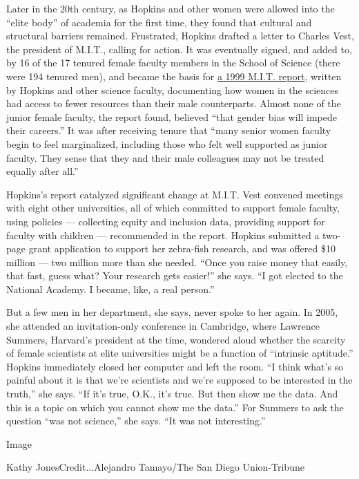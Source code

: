 Later in the 20th century, as Hopkins and other women were allowed into
the ``elite body'' of academia for the first time, they found that
cultural and structural barriers remained. Frustrated, Hopkins drafted a
letter to Charles Vest, the president of M.I.T., calling for action. It
was eventually signed, and added to, by 16 of the 17 tenured female
faculty members in the School of Science (there were 194 tenured men),
and became the basis for
\href{http://web.mit.edu/fnl/women/women.html}{a 1999 M.I.T. report},
written by Hopkins and other science faculty, documenting how women in
the sciences had access to fewer resources than their male counterparts.
Almost none of the junior female faculty, the report found, believed
``that gender bias will impede their careers.'' It was after receiving
tenure that ``many senior women faculty begin to feel marginalized,
including those who felt well supported as junior faculty. They sense
that they and their male colleagues may not be treated equally after
all.''

Hopkins's report catalyzed significant change at M.I.T. Vest convened
meetings with eight other universities, all of which committed to
support female faculty, using policies --- collecting equity and
inclusion data, providing support for faculty with children ---
recommended in the report. Hopkins submitted a two-page grant
application to support her zebra-fish research, and was offered \$10
million --- two million more than she needed. ``Once you raise money
that easily, that fast, guess what? Your research gets easier!'' she
says. ``I got elected to the National Academy. I became, like, a real
person.''

But a few men in her department, she says, never spoke to her again. In
2005, she attended an invitation-only conference in Cambridge, where
Lawrence Summers, Harvard's president at the time, wondered aloud
whether the scarcity of female scientists at elite universities might be
a function of ``intrinsic aptitude.'' Hopkins immediately closed her
computer and left the room. ``I think what's so painful about it is that
we're scientists and we're supposed to be interested in the truth,'' she
says. ``If it's true, O.K., it's true. But then show me the data. And
this is a topic on which you cannot show me the data.'' For Summers to
ask the question ``was not science,'' she says. ``It was not
interesting.''

Image

Kathy JonesCredit...Alejandro Tamayo/The San Diego Union-Tribune

